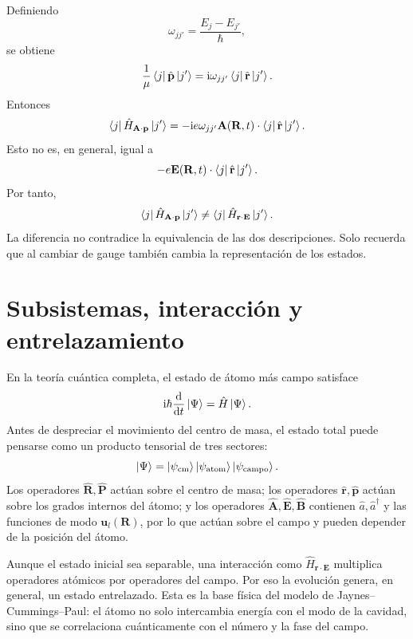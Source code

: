 \documentclass[11pt]{article}
\newcommand{\ii}{\mathrm{i}}
\newcommand{\dd}{\mathrm{d}}
\newcommand{\vb}[1]{\mathbf{#1}}
\newcommand{\adag}{\hat a^\dagger}
\begin{document}
Definiendo
\begin{equation}
  \omega_{jj'}
  =
  \frac{E_j-E_{j'}}{\hbar},
\end{equation}
se obtiene
\begin{equation}
  \frac{1}{\mu}
  \bra j\hat{\vb p}\ket{j'}
  =
  \ii\omega_{jj'}
  \bra j\hat{\vb r}\ket{j'}.
\end{equation}
Entonces
\begin{equation}
  \bra j\hat H_{\vb A\cdot\vb p}\ket{j'}
  =
  -\ii e\omega_{jj'}
  \vb A(\vb R,t)\cdot
  \bra j\hat{\vb r}\ket{j'}.
\end{equation}
Esto no es, en general, igual a
\begin{equation}
  -e\vb E(\vb R,t)\cdot\bra j\hat{\vb r}\ket{j'}.
\end{equation}
Por tanto,
\begin{equation}
  \bra j\hat H_{\vb A\cdot\vb p}\ket{j'}
  \neq
  \bra j\hat H_{\vb r\cdot\vb E}\ket{j'}.
\end{equation}
La diferencia no contradice la equivalencia de las dos descripciones. Solo
recuerda que al cambiar de gauge tambi\'en cambia la representaci\'on de los
estados.

\section{Subsistemas, interacci\'on y entrelazamiento}

En la teor\'ia cu\'antica completa, el estado de \'atomo m\'as campo satisface
\begin{equation}
  \ii\hbar\frac{\dd}{\dd t}\ket{\Psi}
  =
  \hat H\ket{\Psi}.
\end{equation}
Antes de despreciar el movimiento del centro de masa, el estado total puede
pensarse como un producto tensorial de tres sectores:
\begin{equation}
  \ket{\Psi}
  =
  \ket{\psi_{\mathrm{cm}}}
  \ket{\psi_{\mathrm{atom}}}
  \ket{\psi_{\mathrm{campo}}}.
\end{equation}
Los operadores \(\hat{\vb R},\hat{\vb P}\) act\'uan sobre el centro de masa; los
operadores \(\hat{\vb r},\hat{\vb p}\) act\'uan sobre los grados internos del
\'atomo; y los operadores \(\hat{\vb A},\hat{\vb E},\hat{\vb B}\) contienen
\(\hat a,\adag\) y las funciones de modo \(\vb u_l(\vb R)\), por lo que act\'uan
sobre el campo y pueden depender de la posici\'on del \'atomo.

Aunque el estado inicial sea separable, una interacci\'on como
\(\hat H_{\vb r\cdot\vb E}\) multiplica operadores at\'omicos por operadores del
campo. Por eso la evoluci\'on genera, en general, un estado entrelazado. Esta es
la base f\'isica del modelo de Jaynes--Cummings--Paul: el \'atomo no solo
intercambia energ\'ia con el modo de la cavidad, sino que se correlaciona
cu\'anticamente con el n\'umero y la fase del campo.
\end{document}
